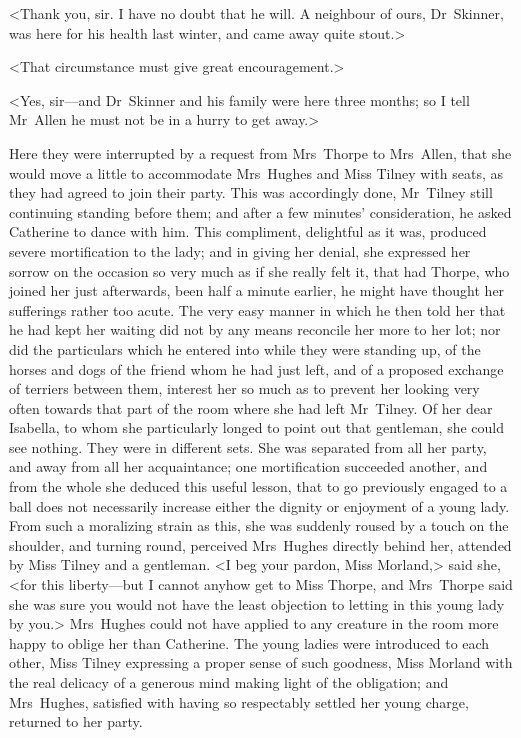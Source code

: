  <Thank you, sir. I have no doubt that he will. A neighbour of ours, Dr~Skinner, was here for his health last winter, and came away quite stout.> 

 <That circumstance must give great encouragement.> 

 <Yes, sir—and Dr~Skinner and his family were here three months; so I tell Mr~Allen he must not be in a hurry to get away.> 

 Here they were interrupted by a request from Mrs~Thorpe to Mrs~Allen, that she would move a little to accommodate Mrs~Hughes and Miss Tilney with seats, as they had agreed to join their party. This was accordingly done, Mr~Tilney still continuing standing before them; and after a few minutes' consideration, he asked Catherine to dance with him. This compliment, delightful as it was, produced severe mortification to the lady; and in giving her denial, she expressed her sorrow on the occasion so very much as if she really felt it, that had Thorpe, who joined her just afterwards, been half a minute earlier, he might have thought her sufferings rather too acute. The very easy manner in which he then told her that he had kept her waiting did not by any means reconcile her more to her lot; nor did the particulars which he entered into while they were standing up, of the horses and dogs of the friend whom he had just left, and of a proposed exchange of terriers between them, interest her so much as to prevent her looking very often towards that part of the room where she had left Mr~Tilney. Of her dear Isabella, to whom she particularly longed to point out that gentleman, she could see nothing. They were in different sets. She was separated from all her party, and away from all her acquaintance; one mortification succeeded another, and from the whole she deduced this useful lesson, that to go previously engaged to a ball does not necessarily increase either the dignity or enjoyment of a young lady. From such a moralizing strain as this, she was suddenly roused by a touch on the shoulder, and turning round, perceived Mrs~Hughes directly behind her, attended by Miss Tilney and a gentleman. <I beg your pardon, Miss Morland,> said she, <for this liberty—but I cannot anyhow get to Miss Thorpe, and Mrs~Thorpe said she was sure you would not have the least objection to letting in this young lady by you.> Mrs~Hughes could not have applied to any creature in the room more happy to oblige her than Catherine. The young ladies were introduced to each other, Miss Tilney expressing a proper sense of such goodness, Miss Morland with the real delicacy of a generous mind making light of the obligation; and Mrs~Hughes, satisfied with having so respectably settled her young charge, returned to her party. 

